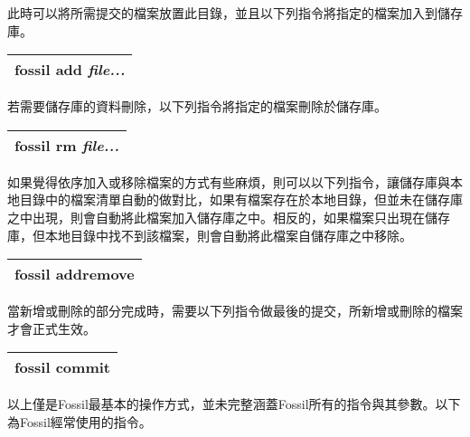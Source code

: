 \par
\renewcommand{\baselinestretch}{1} %
\twelve 此時可以將所需提交的檔案放置此目錄，並且以下列指令將指定的檔案加入到儲存庫。
\par
\begin{center}
\begin{tabular}{||p{15cm}|} %
\hline
\textbf{fossil add} \emph{file...}
\\
\hline
\end{tabular}
\end{center}
\par
\renewcommand{\baselinestretch}{1} %
\twelve 若需要儲存庫的資料刪除，以下列指令將指定的檔案刪除於儲存庫。
\par
\begin{center}
\begin{tabular}{||p{15cm}|} %
\hline
\textbf{fossil rm} \emph{file...}
\\
\hline
\end{tabular}
\end{center}
\par
\renewcommand{\baselinestretch}{1} %
\twelve 如果覺得依序加入或移除檔案的方式有些麻煩，則可以以下列指令，讓儲存庫與本地目錄中的檔案清單自動的做對比，如果有檔案存在於本地目錄，但並未在儲存庫之中出現，則會自動將此檔案加入儲存庫之中。相反的，如果檔案只出現在儲存庫，但本地目錄中找不到該檔案，則會自動將此檔案自儲存庫之中移除。
\par
\begin{center}
\begin{tabular}{||p{15cm}|} %
\hline
\textbf{fossil addremove}
\\
\hline
\end{tabular}
\end{center}
\par
\renewcommand{\baselinestretch}{1} %
\twelve 當新增或刪除的部分完成時，需要以下列指令做最後的提交，所新增或刪除的檔案才會正式生效。
\par
\begin{center}
\begin{tabular}{||p{15cm}|} %
\hline
\textbf{fossil commit}
\\
\hline
\end{tabular}
\end{center}
\par
\renewcommand{\baselinestretch}{1} %
\twelve 以上僅是Fossil最基本的操作方式，並未完整涵蓋Fossil所有的指令與其參數。以下為Fossil經常使用的指令。
\\
